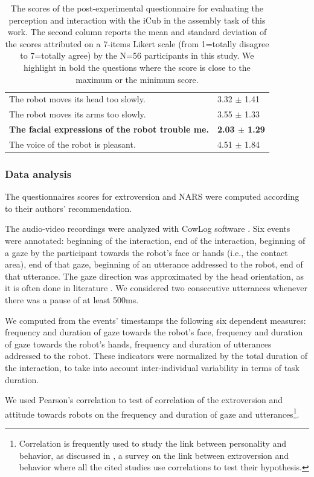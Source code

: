 \begin{table}
{\begin{tabular}{|p{12cm}|p{3.5cm}|}
 The robot moves its head too slowly. & 3.32 $\pm$ 1.41\\
 The robot moves its arms too slowly. & 3.55 $\pm$ 1.33\\
\textbf{The facial expressions of the robot trouble me.}& \textbf{2.03 $\pm$ 1.29}\\
 The voice of the robot is pleasant.& 4.51 $\pm$ 1.84\\
\hline
\end{tabular}}
\caption{The scores of the post-experimental questionnaire for evaluating the perception and interaction with the iCub in the assembly task of this work. The second column reports the mean and standard deviation of the scores attributed on a 7-items Likert scale (from 1=totally disagree to 7=totally agree) by the N=56 participants in this study. We highlight in bold the questions where the score is close to the maximum or the minimum score.}
\label{table:postexperimentquestionnairescores}
\end{table}


\subsubsection{Data analysis}

The questionnaires scores for extroversion and NARS were computed according to their authors' recommendation. 

The audio-video recordings were analyzed with CowLog software \cite{CowLog2009}. 
 Six events were annotated: beginning of the interaction, end of the interaction, beginning of a gaze by the participant towards the robot's face or hands (i.e., the contact area), end of that gaze, beginning of an utterance addressed to the robot, end of that utterance. 
The gaze direction was approximated by the head orientation, as it is often done in literature \cite{ivaldi2014frontiers,Ba2009}. 
We considered two consecutive utterances whenever there was a pause of at least 500ms. 

We computed from the events' timestamps the following six dependent measures: frequency and duration of gaze towards the robot's face, frequency and duration of gaze towards the robot's hands, frequency and duration of utterances addressed to the robot. 
These indicators were normalized by the total duration of the interaction, to take into account inter-individual variability in terms of task duration.

We used Pearson's correlation to test of correlation of the extroversion and attitude towards robots on the frequency and duration of gaze and utterances\footnote{Correlation is frequently used to study the link between personality and behavior, as discussed in \cite{LaFrance2004}, a survey on the link between extroversion and behavior where all the cited studies use correlations to test their hypothesis.}.




